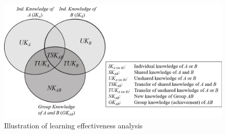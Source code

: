 \begin{frame}
    \begin{figure}[tb]
     \begin{center}
      \includegraphics[width=120mm]{images/rqb_learn-effective.pdf}
      \end{center}
      \caption{Illustration of learning effectiveness analysis}
      \label{learn-effective}  
    \end{figure}
\end{frame}

